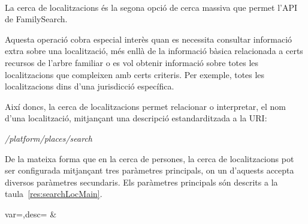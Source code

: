         \paragraph{}
        La cerca de localitzacions és la segona opció de cerca massiva que permet l'API de FamilySearch.

        Aquesta operació cobra especial interès quan es necessita consultar informació extra sobre una localització, més enllà de la informació bàsica relacionada a certs recursos de l'arbre familiar o es vol obtenir informació sobre totes les localitzacions  que compleixen amb certs criteris. Per exemple, totes les localitzacions dins d'una jurisdicció específica.

        Així doncs, la cerca de localitzacions permet relacionar o interpretar, el nom d'una localització, mitjançant una descripció estandarditzada a la URI:

        \begin{displayquote}
            \emph{/platform/places/search}
        \end{displayquote}

        De la mateixa forma que en la cerca de persones, la cerca de localitzacions pot ser configurada mitjançant tres paràmetres principals, on un d'aquests accepta diversos paràmetres secundaris. Els paràmetres principals són descrits a la taula~\ref{res:searchLocMain}.

        \begin{center}
                 {var=\var,desc=\desc}
                 {\var&\desc}
         \end{center}

